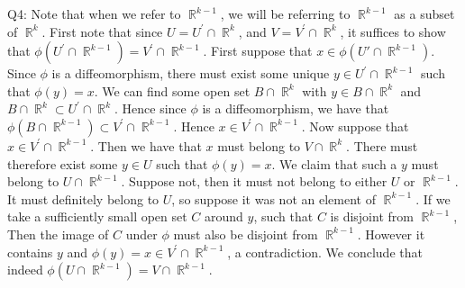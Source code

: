 \documentclass[letterpaper]{article}
\DeclareMathOperator{\R}{\mathbb{R}}
\begin{document}
\noindent Q4: Note that when we refer to $\R^{k-1}$, we will be referring to $\R^{k-1}$ as a subset of $\R^k$. First note that since $U = U^\prime \cap \R^k$, and $V = V^\prime \cap \R^k$, it suffices to show that $\phi(U^\prime \cap \R^{k-1}) = V^\prime \cap \R^{k-1}$. First suppose that $x\in \phi(U\prime \cap \R^{k-1})$. Since $\phi$ is a diffeomorphism, there must exist some unique $y\in U^\prime \cap \R^{k-1}$
such that $\phi(y)=x$. We can find some open set $B\cap \R^k$ with $y\in B \cap \R^k$ and $ B\cap \R^k \subset U^\prime \cap \R^k$. Hence since $\phi$ is a diffeomorphism, we have that $\phi(B \cap \R^{k-1}) \subset V^\prime \cap \R^{k-1}$. Hence $x\in V^\prime \cap \R^{k-1}$. Now suppose that $x\in V^\prime \cap \R^{k-1}$. Then we have that $x$ must belong to $V\cap \R^{k}$. There must therefore exist some $y\in U$ such that $\phi(y)=x$. We claim that such a $y$ must belong to $U \cap \R^{k-1}$. Suppose not, then it must not belong to either $U$ or $\R^{k-1}$. It must definitely belong to $U$, so suppose it was not an element of $\R^{k-1}$. If we take a sufficiently small open set $C$ around $y$, such that $C$ is disjoint from $\R^{k-1}$, Then the image of $C$ under $\phi$ must also be disjoint from $\R^{k-1}$. However it contains $y$ and $\phi(y)=x\in V^\prime \cap \R^{k-1}$, a contradiction. We conclude that indeed $\phi(U\cap \R^{k-1}) = V\cap \R^{k-1}$. 
\end{document}
